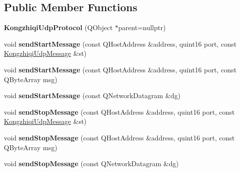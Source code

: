\subsection*{Public Member Functions}
\begin{DoxyCompactItemize}
\item 
\mbox{\label{class_kongzhiqi_udp_protocol_a64538aecb76aef8bf056fa76fd1be96c}} 
{\bfseries Kongzhiqi\+Udp\+Protocol} (Q\+Object $\ast$parent=nullptr)
\item 
\mbox{\label{class_kongzhiqi_udp_protocol_abbffa7c111593a8d8a444141a3154dcb}} 
void {\bfseries send\+Start\+Message} (const Q\+Host\+Address \&address, quint16 port, const \mbox{\hyperlink{class_kongzhiqi_udp_message}{Kongzhiqi\+Udp\+Message}} \&st)
\item 
\mbox{\label{class_kongzhiqi_udp_protocol_a2293c6c2ce6103a03784ef6de572d4fd}} 
void {\bfseries send\+Start\+Message} (const Q\+Host\+Address \&address, quint16 port, const Q\+Byte\+Array msg)
\item 
\mbox{\label{class_kongzhiqi_udp_protocol_ae73d4d1ab13a378a7051a68a366732bd}} 
void {\bfseries send\+Start\+Message} (const Q\+Network\+Datagram \&dg)
\item 
\mbox{\label{class_kongzhiqi_udp_protocol_a61d953a0db543fab9c31fafeaee3f196}} 
void {\bfseries send\+Stop\+Message} (const Q\+Host\+Address \&address, quint16 port, const \mbox{\hyperlink{class_kongzhiqi_udp_message}{Kongzhiqi\+Udp\+Message}} \&st)
\item 
\mbox{\label{class_kongzhiqi_udp_protocol_a90e9e6bff28ed016bd358ba2d2cdc2c1}} 
void {\bfseries send\+Stop\+Message} (const Q\+Host\+Address \&address, quint16 port, const Q\+Byte\+Array msg)
\item 
\mbox{\label{class_kongzhiqi_udp_protocol_ad60a4c099dae840e6ac8ce6dd25e4e78}} 
void {\bfseries send\+Stop\+Message} (const Q\+Network\+Datagram \&dg)
\item 
\mbox{\label{class_kongzhiqi_udp_protocol_aa1f0c846ad6db8f736f219798274d4cb}} 

\end{DoxyCompactItemize}
